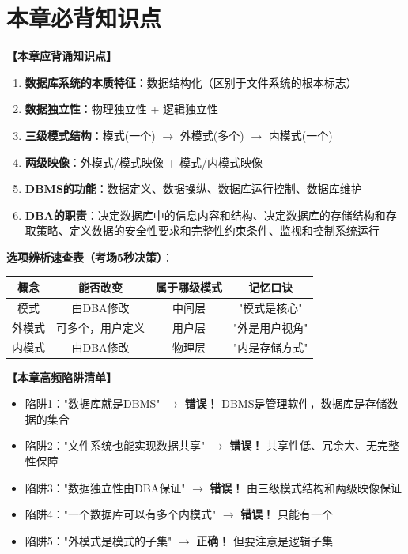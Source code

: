 \documentclass[12pt, a4paper]{article}
\newenvironment{bluebox}[1]{%
  \begin{trivlist}
  \item[\hskip\labelsep \textbf{#1}]
  \setlength{\parskip}{0.5ex}
  \setlength{\itemsep}{0.5ex}
}{%
  \end{trivlist}
}
\begin{document}
\section{本章必背知识点}

\begin{bluebox}{命题人思维版}
	\textbf{【本章应背诵知识点】}

	\begin{enumerate}[leftmargin=*, label=\textbf{\arabic*.}]
		\item \textbf{数据库系统的本质特征}：数据结构化（区别于文件系统的根本标志）
		\item \textbf{数据独立性}：物理独立性 + 逻辑独立性
		\item \textbf{三级模式结构}：模式(一个) $\rightarrow$ 外模式(多个) $\rightarrow$ 内模式(一个)
		\item \textbf{两级映像}：外模式/模式映像 + 模式/内模式映像
		\item \textbf{DBMS的功能}：数据定义、数据操纵、数据库运行控制、数据库维护
		\item \textbf{DBA的职责}：决定数据库中的信息内容和结构、决定数据库的存储结构和存取策略、定义数据的安全性要求和完整性约束条件、监视和控制系统运行
	\end{enumerate}

	\textbf{选项辨析速查表（考场5秒决策）}：

	\begin{tabular}{|c|c|c|c|}
		\hline
		\textbf{概念} & \textbf{能否改变} & \textbf{属于哪级模式} & \textbf{记忆口诀} \\
		\hline
		模式          & 由DBA修改        & 中间层             & "模式是核心"       \\
		\hline
		外模式         & 可多个，用户定义      & 用户层             & "外是用户视角"      \\
		\hline
		内模式         & 由DBA修改        & 物理层             & "内是存储方式"      \\
		\hline
	\end{tabular}
\end{bluebox}

\begin{bluebox}{高频陷阱清单}
	\textbf{【本章高频陷阱清单】}

	\begin{itemize}
		\item 陷阱1："数据库就是DBMS" $\rightarrow$ \textbf{错误！} DBMS是管理软件，数据库是存储数据的集合
		\item 陷阱2："文件系统也能实现数据共享" $\rightarrow$ \textbf{错误！} 共享性低、冗余大、无完整性保障
		\item 陷阱3："数据独立性由DBA保证" $\rightarrow$ \textbf{错误！} 由三级模式结构和两级映像保证
		\item 陷阱4："一个数据库可以有多个内模式" $\rightarrow$ \textbf{错误！} 只能有一个
		\item 陷阱5："外模式是模式的子集" $\rightarrow$ \textbf{正确！} 但要注意是逻辑子集
	\end{itemize}
\end{bluebox}
\end{document}
